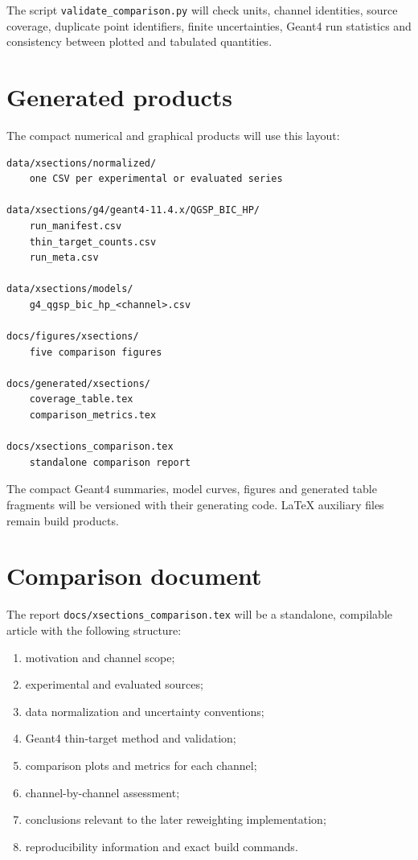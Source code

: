 \documentclass[11pt]{article}
\newcommand{\file}[1]{\texttt{#1}}
\begin{document}
The script \file{validate\_comparison.py} will check units, channel identities,
source coverage, duplicate point identifiers, finite uncertainties, Geant4 run
statistics and consistency between plotted and tabulated quantities.

\section{Generated products}

The compact numerical and graphical products will use this layout:
\begin{verbatim}
data/xsections/normalized/
    one CSV per experimental or evaluated series

data/xsections/g4/geant4-11.4.x/QGSP_BIC_HP/
    run_manifest.csv
    thin_target_counts.csv
    run_meta.csv

data/xsections/models/
    g4_qgsp_bic_hp_<channel>.csv

docs/figures/xsections/
    five comparison figures

docs/generated/xsections/
    coverage_table.tex
    comparison_metrics.tex

docs/xsections_comparison.tex
    standalone comparison report
\end{verbatim}

The compact Geant4 summaries, model curves, figures and generated table
fragments will be versioned with their generating code.  LaTeX auxiliary files
remain build products.

\section{Comparison document}

The report \file{docs/xsections\_comparison.tex} will be a standalone,
compilable article with the following structure:
\begin{enumerate}[nosep]
  \item motivation and channel scope;
  \item experimental and evaluated sources;
  \item data normalization and uncertainty conventions;
  \item Geant4 thin-target method and validation;
  \item comparison plots and metrics for each channel;
  \item channel-by-channel assessment;
  \item conclusions relevant to the later reweighting implementation;
  \item reproducibility information and exact build commands.
\end{enumerate}
\end{document}
